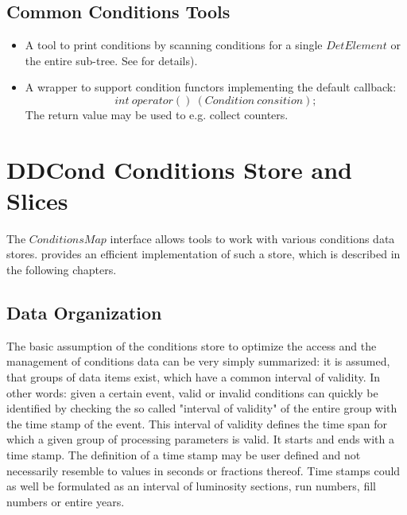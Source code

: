 \documentclass[10pt,a4paper]{article}
\begin{document}
\subsection{Common Conditions Tools}
\label{subsec:ddcond-conditions-tools}

\noindent
\begin{itemize}
\item {} A tool to print conditions by scanning conditions for a 
        single $DetElement$ or the entire sub-tree. See 
        for details).
\item {} A wrapper to support condition functors implementing 
        the default callback:
        $$
        int\ operator()\ (Condition\ consition);
        $$
        The return value may be used to e.g. collect counters.
\end{itemize}

\newpage
\section{DDCond Conditions Store and Slices}
\label{subsec:ddcond-conditions-store}

\noindent
The $ConditionsMap$ interface allows tools to work with various conditions 
data stores. \DDC provides an efficient implementation of such a store,
which is described in the following chapters.

\subsection{Data Organization}
\label{subsec:ddcond-internal-data-organization}

\noindent
The basic assumption of the \DDC conditions store to optimize the access 
and the management of conditions
data can be very simply summarized: it is assumed, that groups of data items
exist, which have a common interval of validity. In other words: given a 
certain event, valid or invalid conditions can quickly be identified by 
checking the so called "interval of validity" of the entire group with the
time stamp of the event. This interval of validity defines the time span
for which a given group of processing parameters is valid. It starts and 
ends with a time stamp. The definition of a time stamp may be user defined 
and not necessarily resemble to values in seconds or fractions thereof. 
Time stamps could as well be formulated as an interval of luminosity sections,
run numbers, fill numbers or entire years. 
\end{document}

